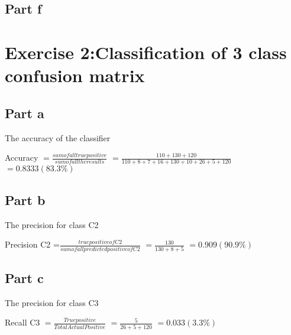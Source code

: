 \documentclass[a4paper, 10pt]{article}
\begin{document}
\subsection{Part f}

\section{Exercise 2:Classification of 3 class confusion matrix}
\subsection{Part a}
The accuracy of the classifier

Accuracy $=\frac{sum of all true positive}{sum of all the results}$
         $=\frac{110+130+120}{110+8+7+16+130+10+26+5+120}$
         $= 0.8333 (83.3 \% )$
          
\subsection{Part b}

The precision for class C2

Precision C2 =$\frac{true positive of C2}{sum of all predicted positive of C2}$
             $=\frac{130}{130+8+5}$ 
             $=0.909 (90.9\%)$

\subsection{Part c}

The precision for class C3

Recall C3 $=\frac{True positive}{Total Actual Positive}$
          $=\frac{5}{26+5+120}$
          $=0.033 (3.3 \% )$
\end{document}
